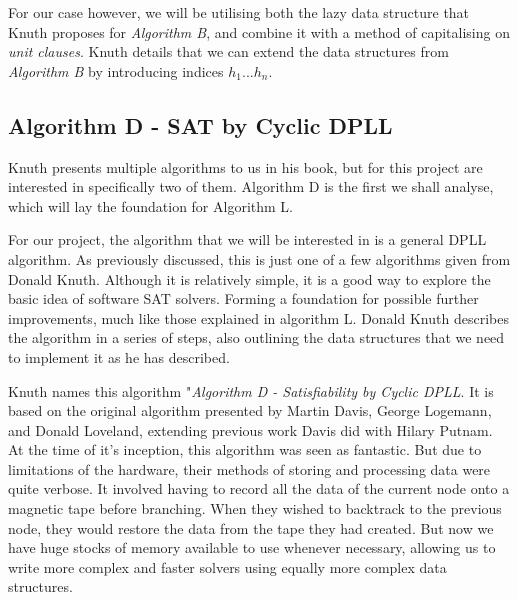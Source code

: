 \documentclass{article}
\begin{document}
For our case however, we will be utilising both the lazy data structure that Knuth proposes for \textit{Algorithm B}, and combine
it with a method of capitalising on \textit{unit clauses}. Knuth details that we can extend the data structures from \textit{Algorithm B} by introducing indices $h_1...h_n$.


\subsection{Algorithm D - SAT by Cyclic DPLL}
Knuth presents multiple algorithms to us in his book, but for this project are interested in specifically two of them. Algorithm D
is the first we shall analyse, which will lay the foundation for Algorithm L.

For our project, the algorithm that we will be interested in is a general DPLL algorithm. As
previously discussed, this is just one of a few algorithms given from Donald Knuth. Although it is
relatively simple, it is a good way to explore the basic idea of software SAT solvers. Forming a
foundation for possible further improvements, much like those explained in algorithm L. Donald Knuth
describes the algorithm in a series of steps, also outlining the data structures that we need to
implement it as he has described.

Knuth names this algorithm "\textit{Algorithm D - Satisfiability by Cyclic DPLL}. It is based on the
original algorithm presented by Martin Davis, George Logemann, and Donald Loveland\cite{dpll},
extending previous work Davis did with Hilary Putnam\cite{putnam}. At the time of it's inception, this
algorithm was seen as fantastic. But due to limitations of the hardware, their methods of storing
and processing data were quite verbose. It involved having to record all the data of the current
node onto a magnetic tape before branching. When they wished to backtrack to the previous node,
they would restore the data from the tape they had created. But now we have huge stocks of memory
available to use whenever necessary, allowing us to write more complex and faster solvers using
equally more complex data structures.
\end{document}
